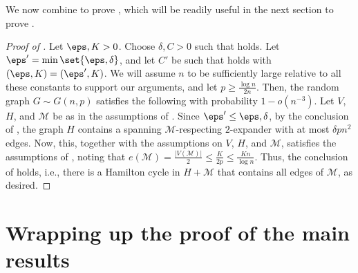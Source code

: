 \documentclass[10pt,a4paper,reqno]{amsart}
\begin{document}
We now combine  to prove , which will be readily useful in the next section to prove .
\begin{proof}[Proof of ]
Let $\eps, K >0$. Choose $\delta, C >0$ such that  holds. Let ${\eps'=\min\set{\eps, \delta}}$, and let $C'$ be such that  holds with $(\eps, K) = (\eps', K)$. We will assume $n$ to be sufficiently large relative to all these constants to support our arguments, and let $p\ge \frac{\log n}{2n}$. Then, the random graph $G\sim G(n,p)$ satisfies the following with probability $1-o(n^{-3})$. Let $V$, $H$, and $\mathcal{M}$ be as in the assumptions of . Since $\eps'\le \eps, \delta$, by the conclusion of , the graph $H$ contains a spanning $\mathcal{M}$-respecting $2$-expander with at most $\delta pn^2$ edges. Now, this, together with the assumptions on $V$, $H$, and $\mathcal{M}$, satisfies the assumptions of , noting that $e(\mathcal{M}) = \frac{|V(\mathcal{M})|}{2} \le \frac{K}{2p} \le \frac{Kn}{\log n}$. Thus, the conclusion of  holds, i.e., there is a Hamilton cycle in $H + \mathcal{M}$ that contains all edges of $\mathcal{M}$, as desired.
\end{proof}


\bigskip \section{Wrapping up the proof of the main results}
\label{sec:wrap up}
\end{document}
